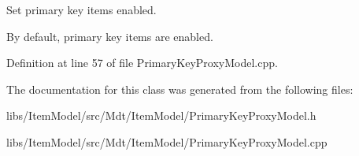 Set primary key items enabled. 

By default, primary key items are enabled. 

Definition at line 57 of file Primary\+Key\+Proxy\+Model.\+cpp.



The documentation for this class was generated from the following files\+:\begin{DoxyCompactItemize}
\item 
libs/\+Item\+Model/src/\+Mdt/\+Item\+Model/Primary\+Key\+Proxy\+Model.\+h\item 
libs/\+Item\+Model/src/\+Mdt/\+Item\+Model/Primary\+Key\+Proxy\+Model.\+cpp\end{DoxyCompactItemize}
